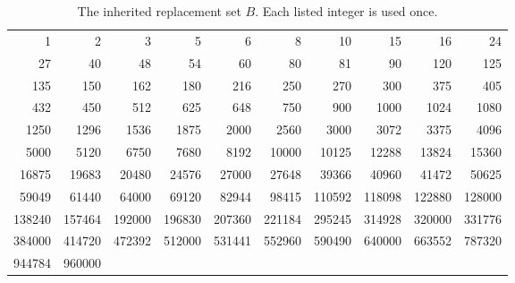 \begin{table}[htbp]\centering\small
\caption{The inherited replacement set $B$. Each listed integer is used once.}
\label{tab:density-replacement}
\begin{tabular}{rrrrrrrrrr}\toprule
1&2&3&5&6&8&10&15&16&24\\
27&40&48&54&60&80&81&90&120&125\\
135&150&162&180&216&250&270&300&375&405\\
432&450&512&625&648&750&900&1000&1024&1080\\
1250&1296&1536&1875&2000&2560&3000&3072&3375&4096\\
5000&5120&6750&7680&8192&10000&10125&12288&13824&15360\\
16875&19683&20480&24576&27000&27648&39366&40960&41472&50625\\
59049&61440&64000&69120&82944&98415&110592&118098&122880&128000\\
138240&157464&192000&196830&207360&221184&295245&314928&320000&331776\\
384000&414720&472392&512000&531441&552960&590490&640000&663552&787320\\
944784&960000&&&&&&&&\\\bottomrule
\end{tabular}
\end{table}

